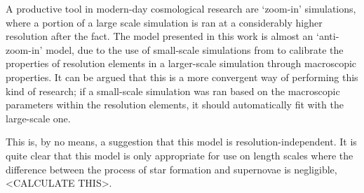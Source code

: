 A productive tool in modern-day cosmological research are `zoom-in' simulations, where a portion of a large scale simulation is ran at a considerably higher resolution after the fact.
The model presented in this work is almost an `anti-zoom-in' model, due to the use of small-scale simulations from \citet{martizzi2015} to calibrate the properties of resolution elements in a larger-scale simulation through macroscopic properties.
It can be argued that this is a more convergent way of performing this kind of research; if a small-scale simulation was ran based on the macroscopic parameters within the resolution elements, it should automatically fit with the large-scale one.

This is, by no means, a suggestion that this model is resolution-independent.
It is quite clear that this model is only appropriate for use on length scales where the difference between the process of star formation and supernovae is negligible, <CALCULATE THIS>.
